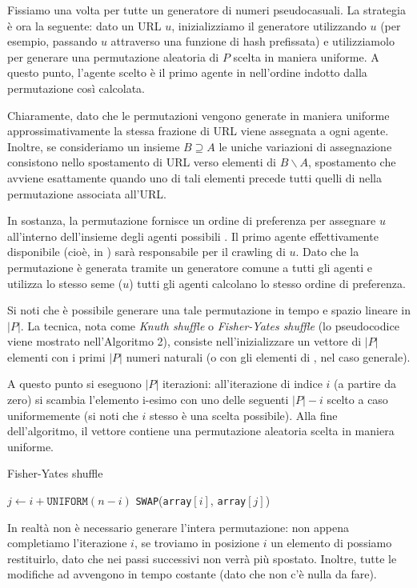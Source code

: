 Fissiamo una volta per tutte un generatore di numeri pseudocasuali. La strategia è ora la seguente: dato un URL $u$, inizializziamo il generatore utilizzando $u$ (per esempio, passando $u$ attraverso una funzione di hash prefissata) e utilizziamolo per generare una permutazione aleatoria di $P$ scelta in maniera uniforme. A questo punto, l'agente scelto è il primo agente in  nell'ordine indotto dalla permutazione così calcolata.

Chiaramente, dato che le permutazioni vengono generate in maniera uniforme approssimativamente la stessa frazione di URL viene assegnata a ogni agente. Inoltre, se consideriamo un insieme $B \supseteq A$ le uniche variazioni di assegnazione consistono nello spostamento di URL verso elementi di $B \smallsetminus A$, spostamento che avviene esattamente quando uno di tali elementi precede tutti quelli di  nella permutazione associata all'URL.

In sostanza, la permutazione fornisce un ordine di preferenza per assegnare $u$ all'interno dell'insieme degli agenti possibili . Il primo agente effettivamente disponibile (cioè, in ) sarà responsabile per il crawling di $u$. Dato che la permutazione è generata tramite un generatore comune a tutti gli agenti e utilizza lo stesso seme ($u$) tutti gli agenti calcolano lo stesso ordine di preferenza.

Si noti che è possibile generare una tale permutazione in tempo e spazio lineare in $|P|$. La tecnica, nota come \textit{Knuth shuffle} o \textit{Fisher-Yates shuffle} (lo pseudocodice viene mostrato nell'Algoritmo 2), consiste nell'inizializzare un vettore di $|P|$ elementi con i primi $|P|$ numeri naturali (o con gli elementi di , nel caso generale).

A questo punto si eseguono $|P|$ iterazioni: all'iterazione di indice $i$ (a partire da zero) si scambia l'elemento i-esimo con uno delle seguenti $|P| - i$ scelto a caso uniformemente (si noti che $i$ stesso è una scelta possibile). Alla fine dell'algoritmo, il vettore contiene una permutazione aleatoria scelta in maniera uniforme.
\begin{algorithm}
\caption{Fisher-Yates shuffle}
\begin{algorithmic}
    \State $j \gets i + \texttt{UNIFORM}(n - i)$
    \State \texttt{SWAP}(\texttt{array}$[i]$, \texttt{array}$[j]$)
    \EndFor
\end{algorithmic}
\end{algorithm}
In realtà non è necessario generare l'intera permutazione: non appena completiamo l'iterazione $i$, se troviamo in posizione $i$ un elemento di  possiamo restituirlo, dato che nei passi successivi non verrà più spostato. Inoltre, tutte le modifiche ad  avvengono in tempo costante (dato che non c'è nulla da fare).
